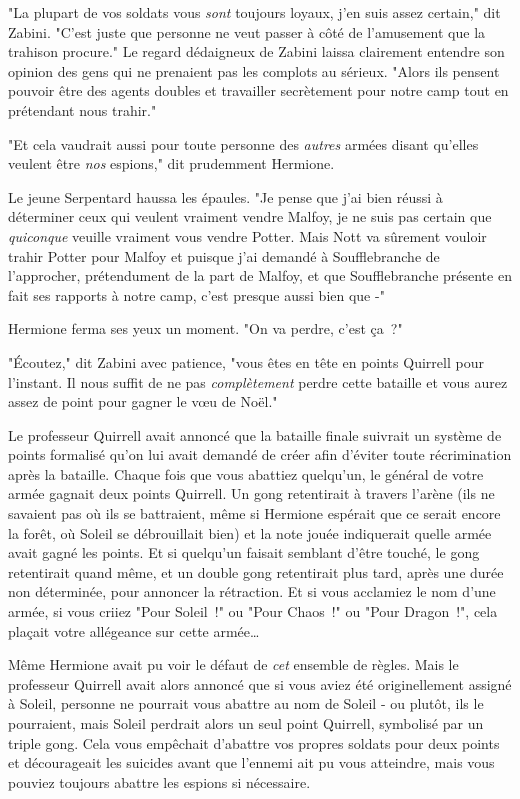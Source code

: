 "La plupart de vos soldats vous \emph{sont} toujours loyaux, j'en suis assez certain," dit Zabini. "C'est juste que personne ne veut passer à côté de l'amusement que la trahison procure." Le regard dédaigneux de Zabini laissa clairement entendre son opinion des gens qui ne prenaient pas les complots au sérieux. "Alors ils pensent pouvoir être des agents doubles et travailler secrètement pour notre camp tout en prétendant nous trahir."

"Et cela vaudrait aussi pour toute personne des \emph{autres} armées disant qu'elles veulent être \emph{nos} espions," dit prudemment Hermione.

Le jeune Serpentard haussa les épaules. "Je pense que j'ai bien réussi à déterminer ceux qui veulent vraiment vendre Malfoy, je ne suis pas certain que \emph{quiconque} veuille vraiment vous vendre Potter. Mais Nott va sûrement vouloir trahir Potter pour Malfoy et puisque j'ai demandé à Soufflebranche de l'approcher, prétendument de la part de Malfoy, et que Soufflebranche présente en fait ses rapports à notre camp, c'est presque aussi bien que -"

Hermione ferma ses yeux un moment. "On va perdre, c'est ça~?"

"Écoutez," dit Zabini avec patience, "vous êtes en tête en points Quirrell pour l'instant. Il nous suffit de ne pas \emph{complètement} perdre cette bataille et vous aurez assez de point pour gagner le vœu de Noël."

Le professeur Quirrell avait annoncé que la bataille finale suivrait un système de points formalisé qu'on lui avait demandé de créer afin d'éviter toute récrimination après la bataille. Chaque fois que vous abattiez quelqu'un, le général de votre armée gagnait deux points Quirrell. Un gong retentirait à travers l'arène (ils ne savaient pas où ils se battraient, même si Hermione espérait que ce serait encore la forêt, où Soleil se débrouillait bien) et la note jouée indiquerait quelle armée avait gagné les points. Et si quelqu'un faisait semblant d'être touché, le gong retentirait quand même, et un double gong retentirait plus tard, après une durée non déterminée, pour annoncer la rétraction. Et si vous acclamiez le nom d'une armée, si vous criiez "Pour Soleil~!" ou "Pour Chaos~!" ou "Pour Dragon~!", cela plaçait votre allégeance sur cette armée…

Même Hermione avait pu voir le défaut de \emph{cet} ensemble de règles. Mais le professeur Quirrell avait alors annoncé que si vous aviez été originellement assigné à Soleil, personne ne pourrait vous abattre au nom de Soleil - ou plutôt, ils le pourraient, mais Soleil perdrait alors un seul point Quirrell, symbolisé par un triple gong. Cela vous empêchait d'abattre vos propres soldats pour deux points et décourageait les suicides avant que l'ennemi ait pu vous atteindre, mais vous pouviez toujours abattre les espions si nécessaire.

